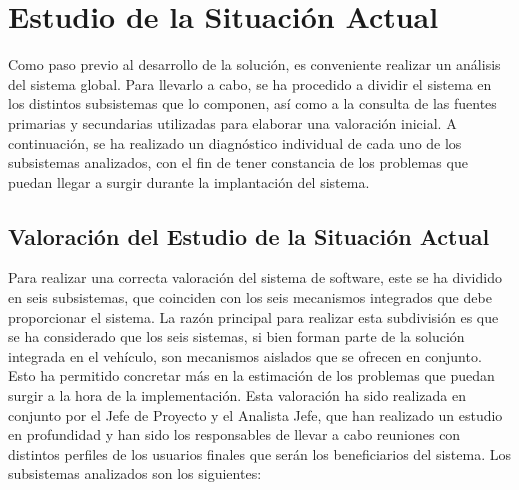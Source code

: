 
\section{Estudio de la Situación Actual}
\par Como paso previo al desarrollo de la solución, es conveniente realizar un análisis del sistema global. Para llevarlo a cabo, se ha procedido a dividir el sistema en los distintos subsistemas que lo componen, así como a la consulta de las fuentes primarias y secundarias utilizadas para elaborar una valoración inicial. A continuación, se ha realizado un diagnóstico individual de cada uno de los subsistemas analizados, con el fin de tener constancia de los problemas que puedan llegar a surgir durante la implantación del sistema.

\subsection{Valoración del Estudio de la Situación Actual}
\par Para realizar una correcta valoración del sistema de software, este se ha dividido en seis subsistemas, que coinciden con los seis mecanismos integrados que debe proporcionar el sistema. La razón principal para realizar esta subdivisión es que se ha considerado que los seis sistemas, si bien  forman parte de la solución integrada en el vehículo, son mecanismos aislados que se ofrecen en conjunto. Esto ha permitido concretar más en la estimación de los problemas que puedan surgir a la hora de la implementación. Esta valoración ha sido realizada en conjunto por el Jefe de Proyecto y el Analista Jefe, que han realizado un estudio en profundidad y han sido los responsables de llevar a cabo reuniones con distintos perfiles de los usuarios finales que serán los beneficiarios del sistema. Los subsistemas analizados son los siguientes:

